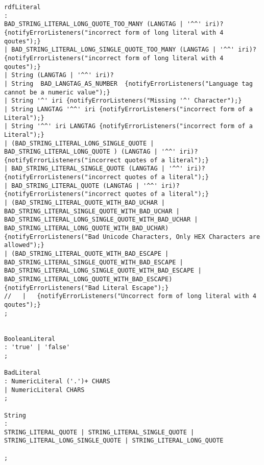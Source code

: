 \begin{appendices}
\begin{lstlisting}[breaklines,basicstyle=\ttfamily]
rdfLiteral
: 
BAD_STRING_LITERAL_LONG_QUOTE_TOO_MANY (LANGTAG | '^^' iri)? {notifyErrorListeners("incorrect form of long literal with 4 qoutes");}
| BAD_STRING_LITERAL_LONG_SINGLE_QUOTE_TOO_MANY (LANGTAG | '^^' iri)? {notifyErrorListeners("incorrect form of long literal with 4 qoutes");}
| String (LANGTAG | '^^' iri)?
| String  BAD_LANGTAG_AS_NUMBER  {notifyErrorListeners("Language tag cannot be a numeric value");}
| String '^' iri {notifyErrorListeners("Missing '^' Character");}
| String LANGTAG '^^' iri {notifyErrorListeners("incorrect form of a Literal");}
| String '^^' iri LANGTAG {notifyErrorListeners("incorrect form of a Literal");}  
| (BAD_STRING_LITERAL_LONG_SINGLE_QUOTE | BAD_STRING_LITERAL_LONG_QUOTE ) (LANGTAG | '^^' iri)?  {notifyErrorListeners("incorrect quotes of a literal");}
| BAD_STRING_LITERAL_SINGLE_QUOTE (LANGTAG | '^^' iri)? {notifyErrorListeners("incorrect quotes of a literal");}
| BAD_STRING_LITERAL_QUOTE (LANGTAG | '^^' iri)? {notifyErrorListeners("incorrect quotes of a literal");}
| (BAD_STRING_LITERAL_QUOTE_WITH_BAD_UCHAR | BAD_STRING_LITERAL_SINGLE_QUOTE_WITH_BAD_UCHAR | BAD_STRING_LITERAL_LONG_SINGLE_QUOTE_WITH_BAD_UCHAR | BAD_STRING_LITERAL_LONG_QUOTE_WITH_BAD_UCHAR) {notifyErrorListeners("Bad Unicode Characters, Only HEX Characters are allowed");}
| (BAD_STRING_LITERAL_QUOTE_WITH_BAD_ESCAPE | BAD_STRING_LITERAL_SINGLE_QUOTE_WITH_BAD_ESCAPE | BAD_STRING_LITERAL_LONG_SINGLE_QUOTE_WITH_BAD_ESCAPE | BAD_STRING_LITERAL_LONG_QUOTE_WITH_BAD_ESCAPE) {notifyErrorListeners("Bad Literal Escape");}
//   |   {notifyErrorListeners("Uncorrect form of long literal with 4 qoutes");}
;


BooleanLiteral
: 'true' | 'false'
;

BadLiteral 
: NumericLiteral ('.')+ CHARS 
| NumericLiteral CHARS 
;

String
: 
STRING_LITERAL_QUOTE | STRING_LITERAL_SINGLE_QUOTE | STRING_LITERAL_LONG_SINGLE_QUOTE | STRING_LITERAL_LONG_QUOTE

;


\end{lstlisting}
\end{appendices}
